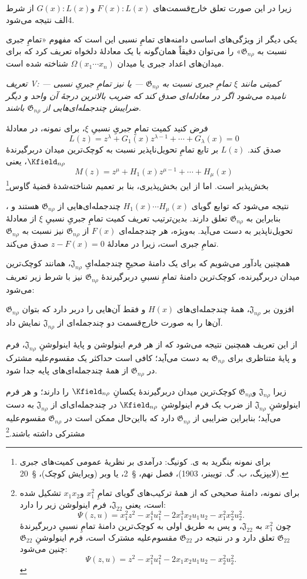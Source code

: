 \documentclass[11pt]{article}
\newcommand{\srcLTR}[1]{\relax\ifmmode\text{\mbox{\babelsublr{\foreignlanguage{english}{#1}}}}\else\babelsublr{\foreignlanguage{english}{#1}}\fi}
\newcommand{\srcfn}[2]{\begingroup\renewcommand{\thefootnote}{\srcLTR{#1}}\footnote{#2}\addtocounter{footnote}{-1}\endgroup}
\providecommand{\Jdom}{\mathfrak{J}}
\providecommand{\Gdom}{\mathfrak{G}}
\begin{document}
زیرا در این صورت تعلق خارج‌قسمت‌های $F(x):L(x)$ و$G(x):L(x)$ از شرط 4الف نتیجه می‌شود.

یکی دیگر از ویژگی‌های اساسی دامنه‌های تمامِ نسبی این است که مفهوم «تمامِ جبری نسبت به $\Gdom_{n\rho}$» را می‌توان دقیقاً همان‌گونه با یک معادلهٔ دلخواه تعریف کرد که برای میدان‌های اعداد جبری یا میدان $\Omega(x_1\cdots x_n)$ شناخته شده است.

\emph{تعریف V: کمیتی مانند $\xi$ تمامِ جبری نسبت به $\Gdom_{n\rho}$ --- یا نیز تمامِ جبریِ نسبی --- نامیده می‌شود اگر در معادله‌ای صدق کند که ضریب بالاترین درجهٔ آن واحد و دیگر ضرایبش چندجمله‌ای‌هایی از $\Gdom_{n\rho}$ باشند.}

فرض کنید کمیت تمامِ جبریِ نسبیِ $\xi$، برای نمونه، در معادلهٔ
\[
L(z)=z^\lambda+G_1(x)z^{\lambda-1}+\cdots+G_\lambda(x)=0
\]
صدق کند. $L(z)$ بر تابع تمامِ تحویل‌ناپذیر نسبت به کوچک‌ترین میدان دربرگیرندهٔ $\Kfield_{n\rho}$، یعنی
\[
M(z)=z^\mu+H_1(x)z^{\mu-1}+\cdots+H_\mu(x)
\]
بخش‌پذیر است. اما از این بخش‌پذیری، بنا بر تعمیم شناخته‌شدهٔ قضیهٔ گاوس\srcfn{*)}{برای نمونه بنگرید به ی. کونیگ: درآمدی بر نظریهٔ عمومی کمیت‌های جبری (لایپزیگ، ب. گ. تویبنر، 1903)، فصل نهم، \S\ 2، یا وبر (ویرایش کوچک)، \S\ 20.}، نتیجه می‌شود که توابع گویای $H_1(x)\cdots H_\mu(x)$ چندجمله‌ای‌هایی از $\Gdom_{n\rho}$ هستند و بنابراین به $\Gdom_{n\rho}$ تعلق دارند. بدین‌ترتیب تعریف کمیت تمامِ جبریِ نسبیِ $\xi$ از معادلهٔ تحویل‌ناپذیر به دست می‌آید. به‌ویژه، هر چندجمله‌ای $F(x)$ از $\Gdom_{n\rho}$ نیز نسبت به $\Gdom_{n\rho}$ تمامِ جبری است، زیرا در معادلهٔ $z-F(x)=0$ صدق می‌کند.

همچنین یادآور می‌شویم که برای یک دامنهٔ صحیحِ چندجمله‌ایِ $\Jdom_{n\rho}$، همانند کوچک‌ترین میدان دربرگیرنده، کوچک‌ترین دامنهٔ تمامِ نسبیِ دربرگیرندهٔ $\Gdom_{n\rho}$ نیز با شرط زیر تعریف می‌شود:

$\Gdom_{n\rho}$ افزون بر $\Jdom_{n\rho}$، همهٔ چندجمله‌ای‌های $H(x)$ و فقط آن‌هایی را دربر دارد که بتوان آن‌ها را به صورت خارج‌قسمت دو چندجمله‌ای از $\Jdom_{n\rho}$ نمایش داد.

از این تعریف همچنین نتیجه می‌شود که از هر فرم اینولوشن و پایهٔ اینولوشنِ $\Jdom_{n\rho}$، فرم و پایهٔ متناظری برای $\Gdom_{n\rho}$ به دست می‌آید؛ کافی است حداکثر یک مقسوم‌علیه مشترک در $\Gdom_{n\rho}$ از همهٔ چندجمله‌ای‌های پایه جدا شود.

زیرا $\Jdom_{n\rho}$ و$\Gdom_{n\rho}$ کوچک‌ترین میدان دربرگیرندهٔ یکسانِ $\Kfield_{n\rho}$ را دارند؛ و هر فرم اینولوشنِ $\Jdom_{n\rho}$ از ضرب یک فرم اینولوشنِ $\Kfield_{n\rho}$ در چندجمله‌ای‌ای از $\Jdom_{n\rho}$ به دست می‌آید؛ بنابراین ضرایبی از $\Gdom_{n\rho}$ دارد که بااین‌حال ممکن است در $\Gdom_{n\rho}$ مقسوم‌علیه مشترکی داشته باشند.\srcfn{*)}{برای نمونه، دامنهٔ صحیحی که از همهٔ ترکیب‌های گویای تمامِ $x_1^2$ و$x_1x_2$ تشکیل شده است، یعنی $\Jdom_{22}$، فرم اینولوشن زیر را دارد:
\[
\Psi(z,u)=x_1^2z^2-x_1^4u_1^2-2x_1^3x_2u_1u_2-x_1^2x_2^2u_2^2.
\]
چون $x_1^2$ به $\Jdom_{22}$، و پس به طریق اولی به کوچک‌ترین دامنهٔ تمامِ نسبیِ دربرگیرندهٔ $\Gdom_{22}$ تعلق دارد و در نتیجه در $\Gdom_{22}$ مقسوم‌علیه مشترک است، فرم اینولوشنِ $\Gdom_{22}$ چنین می‌شود:
\[
\Psi(z,u)=z^2-x_1^2u_1^2-2x_1x_2u_1u_2-x_2^2u_2^2.
\]}
\end{document}
